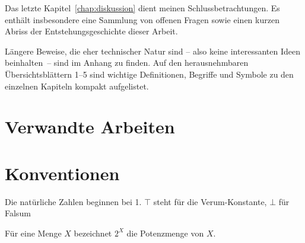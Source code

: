 Das
letzte Kapitel~\ref{chap:diskussion} dient meinen Schlussbetrachtungen.
Es enthält insbesondere eine Sammlung von offenen Fragen %
sowie einen kurzen Abriss der Entstehungsgeschichte dieser Arbeit.

Längere
Beweise, die eher technischer Natur sind -- also keine interessanten Ideen beinhalten~-- sind im Anhang zu finden.
Auf den herausnehmbaren Übersichtsblättern 1--5 sind wichtige Definitionen, Begriffe und Symbole zu den einzelnen Kapiteln kompakt aufgelistet.

\section{Verwandte Arbeiten}



\section{Konventionen}
Die natürliche Zahlen beginnen bei 1.
$\top$ steht für die Verum-Konstante, $\bot$ für Falsum

Für eine Menge $X$ bezeichnet $2^X$ die Potenzmenge von $X$.


